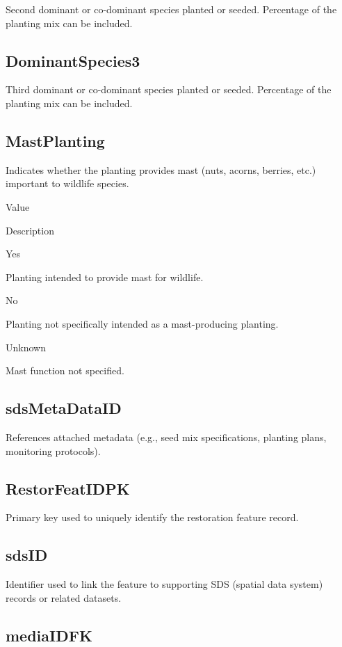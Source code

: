 \documentclass[
  letterpaper,
  DIV=11,
  numbers=noendperiod]{scrreprt}
\begin{document}
Second dominant or co-dominant species planted or seeded. Percentage of
the planting mix can be included.

\subsection{DominantSpecies3}\label{dominantspecies3}

Third dominant or co-dominant species planted or seeded. Percentage of
the planting mix can be included.

\subsection{MastPlanting}\label{mastplanting}

Indicates whether the planting provides mast (nuts, acorns, berries,
etc.) important to wildlife species.

Value

Description

Yes

Planting intended to provide mast for wildlife.

No

Planting not specifically intended as a mast-producing planting.

Unknown

Mast function not specified.

\subsection{sdsMetaDataID}\label{sdsmetadataid-4}

References attached metadata (e.g., seed mix specifications, planting
plans, monitoring protocols).

\subsection{RestorFeatIDPK}\label{restorfeatidpk-4}

Primary key used to uniquely identify the restoration feature record.

\subsection{sdsID}\label{sdsid-4}

Identifier used to link the feature to supporting SDS (spatial data
system) records or related datasets.

\subsection{mediaIDFK}\label{mediaidfk-4}
\end{document}
